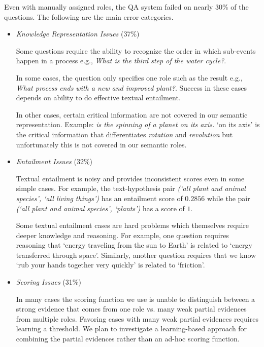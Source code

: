 Even with manually assigned roles, the QA system failed on nearly 30\% of the questions. The following are the main error categories.
\begin{itemize}
\item {\em Knowledge Representation Issues} (37\%)

Some questions require the ability to recognize the order in which sub-events happen in a process e.g., {\em What is the third step of the water cycle?}.

In some cases, the question only specifies one role such as the result e.g., {\em What process ends with a new and improved plant?}. Success in these cases depends on ability to do effective textual entailment. 

In other cases, certain critical information are not covered in our semantic representation. Example: {\em \underline{\hspace{1cm}} is the spinning of a planet on its axis.} `on its axis' is the critical information that differentiates {\em rotation} and {\em revolution} but unfortunately this is not covered in our semantic roles.
\item {\em Entailment Issues} (32\%)

Textual entailment is noisy and provides inconsistent scores even in some simple cases. For example, the text-hypothesis pair {\em(`all plant and animal species', `all living things')} has an entailment score of $0.2856$ while the pair {\em(`all plant and animal species', `plants')} has a score of $1$.

Some textual entailment cases are hard problems which themselves require deeper knowledge and reasoning. For example, one question requires reasoning that `energy traveling from the sun to Earth' is related to `energy transferred through space'. Similarly, another question requires that we know `rub your hands together very quickly' is related to `friction'.

\item {\em Scoring Issues} (31\%) 

In many cases the scoring function we use is unable to distinguish between a strong evidence that comes from one role vs. many weak partial evidences from multiple roles. Favoring cases with many weak partial evidences requires learning a threshold.  We plan to investigate a learning-based approach for combining the partial evidences rather than an ad-hoc scoring function. 
\end{itemize}